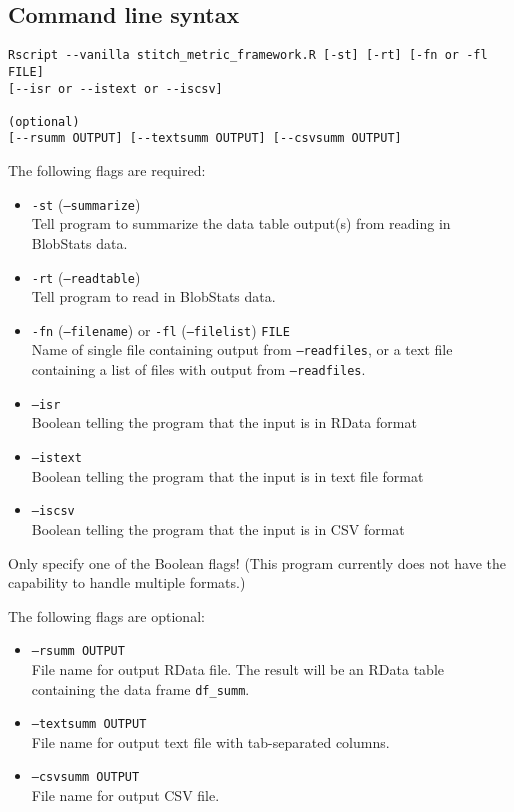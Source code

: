 \documentclass{article}
\begin{document}
\subsection{Command line syntax}
\begin{verbatim}
Rscript --vanilla stitch_metric_framework.R [-st] [-rt] [-fn or -fl FILE] 
[--isr or --istext or --iscsv]

(optional)
[--rsumm OUTPUT] [--textsumm OUTPUT] [--csvsumm OUTPUT]
\end{verbatim}

The following flags are required:
\begin{itemize}
\item[] \texttt{-st} (\texttt{--summarize})\\ Tell program to summarize the data table output(s) from reading in BlobStats data.
\item[] \texttt{-rt} (\texttt{--readtable}) \\ Tell program to read in BlobStats data.
\item[]\texttt{-fn} (\texttt{--filename}) or \texttt{-fl} (\texttt{--filelist}) \texttt{FILE}\\ Name of single file containing output from \texttt{--readfiles}, or a text file containing a list of files with output from \texttt{--readfiles}.
\item[]\texttt{--isr}\\Boolean telling the program that the input is in RData format
\item[]\texttt{--istext}\\Boolean telling the program that the input is in text file format
\item[] \texttt{--iscsv}\\Boolean telling the program that the input is in CSV format
\end{itemize}

Only specify one of the Boolean flags! (This program currently does not have the capability to handle multiple formats.)

The following flags are optional:
\begin{itemize}
\item[] \texttt{--rsumm OUTPUT}\\ File name for output RData file. The result will be an RData table containing the data frame \texttt{df\_summ}.
\item[] \texttt{--textsumm OUTPUT}\\ File name for output text file with tab-separated columns.
\item[] \texttt{--csvsumm OUTPUT}\\File name for output CSV file. 
\end{itemize}
\end{document}
